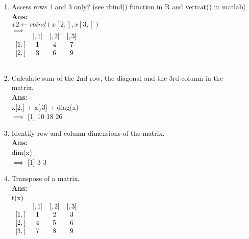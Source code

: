 \documentclass[fontsize=10pt]{scrartcl}
\begin{document}
\begin{enumerate}
\begin{enumerate}
				\item
				Access rows 1 and 3 only? (see rbind() function in R and vertcat() in matlab) \\
				\textbf{Ans:} \\
				$x2 \leftarrow rbind(x[2,],x[3,])$ \\
				$\implies$ \\
				$\begin{array}{cccc}
					~		&	[,1]	&	[,2]	&	[,3]	\\ \relax
					[1,]	&	1		&	4		&	7		\\ \relax
					[2,]	&	3		&	6		&	9		\\ \relax
				\end{array}$

				\item
				Calculate sum of the 2nd row, the diagonal and the 3rd column in the matrix. \\
				\textbf{Ans:} \\
				x[2,] + x[,3] + diag(x) \\
				$\implies$  [1] 10 18 26 \\

				\item
				Identify row and column dimensions of the matrix.\\
				\textbf{Ans:} \\
				dim(x) \\
				$\implies$ [1] 3 3 \\

				\item
				Transpose of a matrix. \\
				\textbf{Ans:} \\
				t(x) \\
				$\begin{array}{cccc}
				~		&	[,1]	&	[,2]	&	[,3]	\\ \relax
				[1,]	&	1		&	2		&	3		\\ \relax
				[2,]	&	4		&	5		&	6		\\ \relax
				[3,]	&	7		&	8		&	9		\\ \relax
				\end{array}$
			\end{enumerate}
		\end{enumerate}
\end{document}
